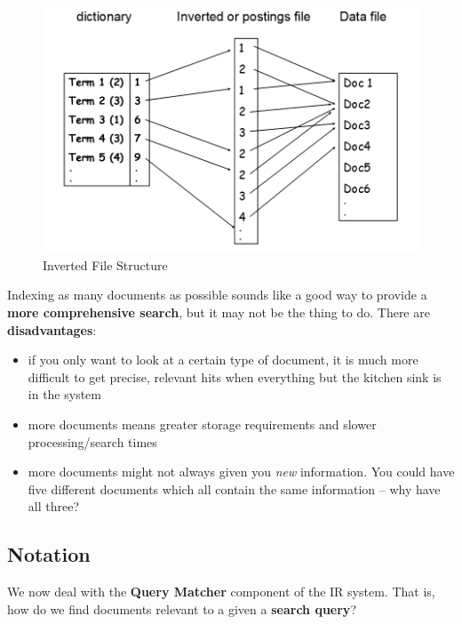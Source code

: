 \documentclass{article}
\begin{document}
\begin{figure}
	\centering
	\includegraphics[scale=0.4]{figures/inverted-file-structure.png}
	\caption{Inverted File Structure}
	\label{fig:inverted-file-structure}
\end{figure}

Indexing as many documents as possible sounds like a good way to provide a \textbf{more comprehensive search}, but it may not be the thing to do.  There are \textbf{disadvantages}:
\begin{itemize}
	\item if you only want to look at a certain type of document, it is much more difficult to get precise, relevant hits when everything but the kitchen sink is in the system
	\item more documents means greater storage requirements and slower processing/search times
	\item more documents might not always given you \textit{new} information. You could have five different documents which all contain the same information -- why have all three?
\end{itemize}

\subsection{Notation}

We now deal with the \textbf{Query Matcher} component of the IR system. That is, how do we find documents relevant to a given a \textbf{search query}?

\paragraph{}
\end{document}
